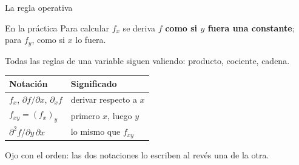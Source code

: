 \documentclass[11pt,aspectratio=169]{beamer}
\begin{document}
\begin{frame}{La regla operativa}
  \begin{block}{En la práctica}
    Para calcular $f_x$ se deriva $f$ \textbf{como si $y$ fuera una constante}; para $f_y$, como si $x$ lo fuera.
  \end{block}
  \pause
  \vspace{4pt}
  Todas las reglas de una variable siguen valiendo: producto, cociente, cadena.
  \vspace{8pt}
  \pause
  \begin{center}
  \begin{tabular}{ll}
    \toprule
    \textbf{Notación} & \textbf{Significado} \\
    \midrule
    $f_x$, $\partial f/\partial x$, $\partial_x f$ & derivar respecto a $x$ \\
    $f_{xy}=(f_x)_y$ & primero $x$, luego $y$ \\
    $\partial^2 f/\partial y\,\partial x$ & lo mismo que $f_{xy}$ \\
    \bottomrule
  \end{tabular}
  \end{center}
  \vspace{6pt}
  \pause
  \begin{center}\small\color{gray60} Ojo con el orden: las dos notaciones lo escriben al revés una de la otra.\end{center}
\end{frame}
\end{document}
